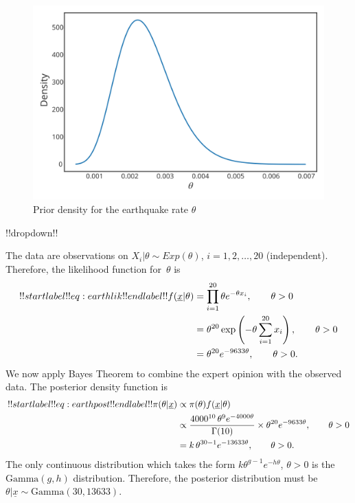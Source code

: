 {\begin{figure}[ht]
\includegraphics{images/priorplot4.svg}
\caption{Prior density for the earthquake rate $\theta$}


\end{figure}



!!dropdown!!

The data are observations on $X_i|\theta\sim Exp(\theta)$, $i=1,2,\ldots,20$ (independent). Therefore, the likelihood function for~$\theta$ is
    \begin{align}
    !!startlabel!! eq:earthlik !!endlabel!!
    f(\underline{x}|\theta)&=\prod_{i=1}^{20} \theta e^{-\theta x_i}, 
    \quad\quad\theta>0 \notag \\
    &=\theta^{20}\exp\left(-\theta\sum_{i=1}^{20} x_i\right),
    \quad\quad\theta>0 \notag \\
    &=\theta^{20} e^{-9633\theta},
    \quad\quad\theta>0. 
    \end{align}
    We now apply Bayes Theorem to combine the expert opinion with the observed data. The posterior density function is
    \begin{align}
    !!startlabel!! eq:earthpost !!endlabel!!
    \pi(\theta|\underline{x})&\propto\pi(\theta)f(\underline{x}|\theta) \notag \\
    &\propto\frac{4000^{10}\,\theta^{9}e^{-4000\theta}}{\Gamma(10)}\times
    \theta^{20} e^{-9633\theta},\quad\quad\theta>0 \notag  \\
    &=k\,\theta^{30-1}e^{-13633\theta},\quad\quad\theta>0.
    \end{align}
    The only continuous distribution which takes the form
    $k\theta^{g-1}e^{-h\theta}$, $\theta>0$ is the $\mathrm{Gamma}(g,h)$ distribution.
    Therefore, the posterior distribution must be $\theta|\underline{x}\sim
    \mathrm{Gamma}(30,13633)$.

}
